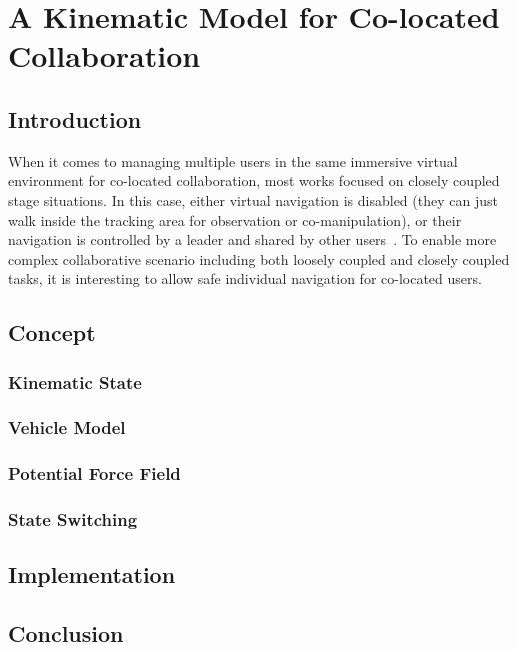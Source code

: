 \chapter{A Kinematic Model for Co-located Collaboration}
\label{chapter:kinematics}
\minitoc

\section{Introduction}
When it comes to managing multiple users in the same immersive virtual environment for co-located collaboration, most works focused on closely coupled stage situations. In this case, either virtual navigation is disabled (they can just walk inside the tracking area for observation or co-manipulation), or their navigation is controlled by a leader and shared by other users~\citep{Beck2013IGG, Kulik2011CSS}. To enable more complex collaborative scenario including both loosely coupled and closely coupled tasks, it is interesting to allow safe individual navigation for co-located users.

\section{Concept}
\subsection{Kinematic State}
\subsection{Vehicle Model}
\subsection{Potential Force Field}
\subsection{State Switching}

\section{Implementation}

\section{Conclusion}
